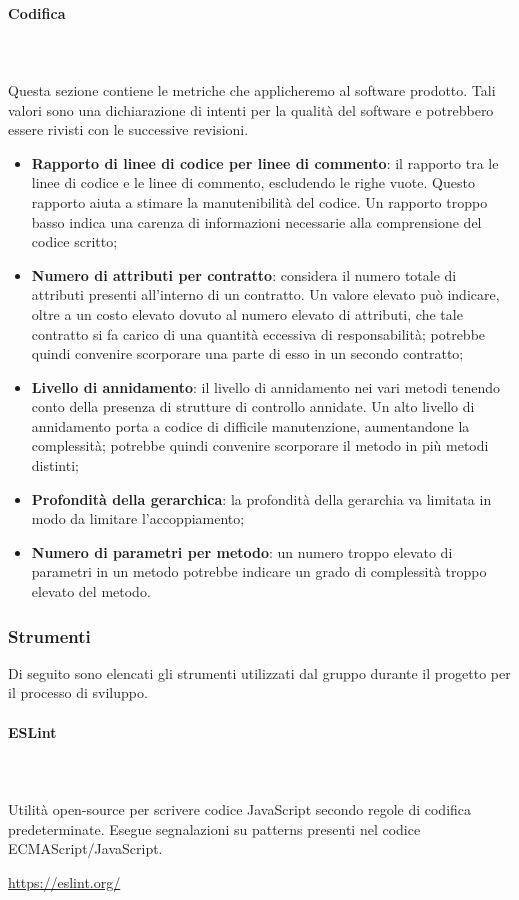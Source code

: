 \paragraph{Codifica} \mbox{}\\ \mbox{}\\
Questa sezione contiene le metriche che applicheremo al software prodotto. Tali  valori  sono  una  dichiarazione  di  intenti  per  la qualità del software e potrebbero essere rivisti con le successive revisioni.
	\begin{itemize}
		\item \textbf{Rapporto di linee di codice per linee di commento}: il rapporto tra le linee di codice e le linee di commento, escludendo le righe vuote.  Questo rapporto aiuta a stimare la manutenibilità del codice.  Un rapporto troppo basso indica una carenza di informazioni	necessarie alla comprensione del codice scritto;
		\item \textbf{Numero di attributi per contratto}: considera il numero totale di attributi presenti all'interno di un contratto. Un valore elevato può indicare, oltre a un costo elevato dovuto al numero elevato di attributi, che tale contratto si fa carico di una quantità eccessiva di responsabilità; potrebbe quindi convenire scorporare una parte di esso in un secondo contratto;
		\item \textbf{Livello di annidamento}: il livello di annidamento nei vari metodi tenendo	conto della presenza di strutture di controllo annidate.  Un alto livello di annidamento porta a codice di difficile manutenzione, aumentandone la complessità; potrebbe quindi convenire scorporare il metodo in più metodi distinti;
		\item \textbf{Profondità della gerarchica}: la profondità della gerarchia va limitata in modo da limitare l'accoppiamento;
		\item \textbf{Numero di parametri per metodo}: un numero troppo elevato di parametri in un metodo potrebbe indicare un grado di complessità troppo elevato del metodo.
	\end{itemize}

\subsubsection{Strumenti}
Di seguito sono elencati gli strumenti utilizzati dal gruppo durante il 
progetto per il processo di sviluppo.
		
\paragraph{ESLint} \mbox{}\\ \mbox{}\\
Utilità open-source per scrivere codice JavaScript secondo regole di codifica 
predeterminate. Esegue segnalazioni su patterns presenti nel codice 
ECMAScript/JavaScript.\\
\centerline{\url{https://eslint.org/}}
		

